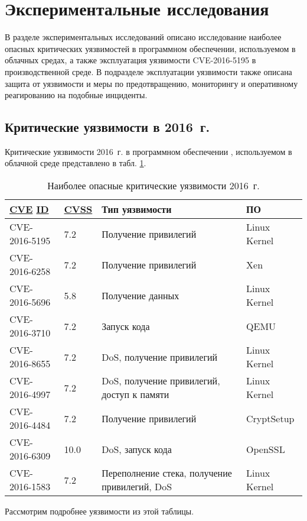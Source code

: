 \section{Экспериментальные исследования}

В разделе экспериментальных исследований описано исследование наиболее опасных критических уязвимостей в программном обеспечении, используемом в облачных средах, а также эксплуатация уязвимости CVE-2016-5195 в производственной среде.
В подразделе эксплуатации уязвимости также описана защита от уязвимости и меры по предотвращению, мониторингу и оперативному реагированию на подобные инциденты.

\subsection{Критические уязвимости в 2016~г.}

Критические уязвимости 2016~г. в программном обеспечении \cite{cvedetails}, используемом в облачной среде представлено в табл. \ref{vulns}.
\begin{table}[H]
  \caption{Наиболее опасные критические уязвимости 2016~г.}\label{vulns}
  \begin{tabular}{|l|p{2cm}|p{7cm}|l|}
  \hline \hyperlink{cve}{CVE} \hyperlink{id}{ID} & \hyperlink{cvss}{CVSS} & Тип уязвимости & ПО \\
  \hline CVE-2016-5195 & 7.2 & Получение привилегий & Linux Kernel \\
  \hline CVE-2016-6258 & 7.2 & Получение привилегий & Xen \\
  \hline CVE-2016-5696 & 5.8 & Получение данных & Linux Kernel \\
  \hline CVE-2016-3710 & 7.2 & Запуск кода & QEMU \\
  \hline CVE-2016-8655 & 7.2 & DoS, получение привилегий & Linux Kernel \\
  \hline CVE-2016-4997 & 7.2 & DoS, получение привилегий, доступ к памяти & Linux Kernel \\
  \hline CVE-2016-4484 & 7.2 & Получение привилегий & CryptSetup \\
  \hline CVE-2016-6309 & 10.0 & DoS, запуск кода & OpenSSL\\
  \hline CVE-2016-1583 & 7.2 & Переполнение стека, получение привилегий, DoS & Linux Kernel \\
  \hline
  \end{tabular}
\end{table}

Рассмотрим подробнее уязвимости из этой таблицы.

